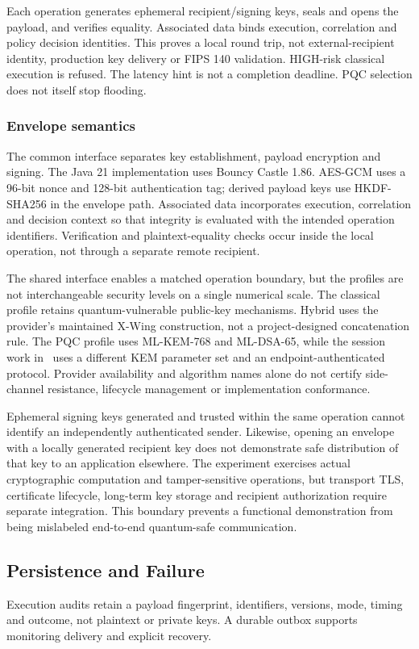 \documentclass[conference,a4paper]{IEEEtran}
\begin{document}
Each operation generates ephemeral recipient/signing keys, seals and opens the payload, and verifies equality. Associated data binds execution, correlation and policy decision identities. This proves a local round trip, not external-recipient identity, production key delivery or FIPS 140 validation. HIGH-risk classical execution is refused. The latency hint is not a completion deadline. PQC selection does not itself stop flooding.

\subsubsection{Envelope semantics}
The common interface separates key establishment, payload encryption and signing. The Java 21 implementation uses Bouncy Castle 1.86. AES-GCM uses a 96-bit nonce and 128-bit authentication tag; derived payload keys use HKDF-SHA256 in the envelope path. Associated data incorporates execution, correlation and decision context so that integrity is evaluated with the intended operation identifiers. Verification and plaintext-equality checks occur inside the local operation, not through a separate remote recipient.

The shared interface enables a matched operation boundary, but the profiles are not interchangeable security levels on a single numerical scale. The classical profile retains quantum-vulnerable public-key mechanisms. Hybrid uses the provider's maintained X-Wing construction, not a project-designed concatenation rule. The PQC profile uses ML-KEM-768 and ML-DSA-65, while the session work in~\cite{session} uses a different KEM parameter set and an endpoint-authenticated protocol. Provider availability and algorithm names alone do not certify side-channel resistance, lifecycle management or implementation conformance.

Ephemeral signing keys generated and trusted within the same operation cannot identify an independently authenticated sender. Likewise, opening an envelope with a locally generated recipient key does not demonstrate safe distribution of that key to an application elsewhere. The experiment exercises actual cryptographic computation and tamper-sensitive operations, but transport TLS, certificate lifecycle, long-term key storage and recipient authorization require separate integration. This boundary prevents a functional demonstration from being mislabeled end-to-end quantum-safe communication.

\subsection{Persistence and Failure}
Execution audits retain a payload fingerprint, identifiers, versions, mode, timing and outcome, not plaintext or private keys. A durable outbox supports monitoring delivery and explicit recovery.
\end{document}
